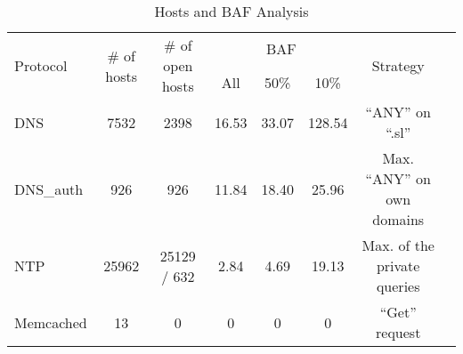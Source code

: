 \documentclass[twocolumn]{article}
\begin{document}
\begin{table*}[ht]
\centering
\caption{Hosts and BAF Analysis}
\begin{tabular}{lccccccc}
\toprule
\multirow{2}{*}{Protocol} & \multirow{2}{*}{\# of hosts} & \multirow{2}{*}{\# of open hosts} & \multicolumn{3}{c}{BAF} & \multirow{2}{*}{Strategy} \\
\cmidrule(r){4-6}
 &  &  & All & 50\% & 10\% &  \\
\midrule
DNS & 7532 & 2398 & 16.53 & 33.07 & 128.54 & ``ANY'' on ``.sl'' \\
DNS_{auth} & 926 & 926 & 11.84 & 18.40 & 25.96 & Max. ``ANY'' on own domains \\
NTP & 25962 & 25129 / 632  & 2.84 & 4.69 & 19.13 & Max. of the private queries\\
Memcached & 13 & 0 & 0 & 0 & 0 & ``Get'' request \\
\bottomrule
\end{tabular}
\label{tab:hosts_baf}
\end{table*}
\end{document}
